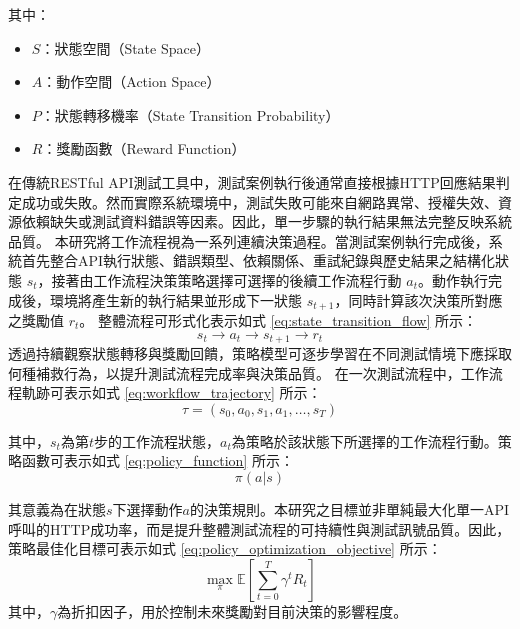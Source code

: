 \begin{ZhChapter}
其中：
\begin{itemize}
\item $S$：狀態空間（State Space）
\item $A$：動作空間（Action Space）
\item $P$：狀態轉移機率（State Transition Probability）
\item $R$：獎勵函數（Reward Function）
\end{itemize}
\text 在傳統RESTful API測試工具中，測試案例執行後通常直接根據HTTP回應結果判定成功或失敗。然而實際系統環境中，測試失敗可能來自網路異常、授權失效、資源依賴缺失或測試資料錯誤等因素。因此，單一步驟的執行結果無法完整反映系統品質。
\text 本研究將工作流程視為一系列連續決策過程。當測試案例執行完成後，系統首先整合API執行狀態、錯誤類型、依賴關係、重試紀錄與歷史結果之結構化狀態 $s_t$，接著由工作流程決策策略選擇可選擇的後續工作流程行動 $a_t$。動作執行完成後，環境將產生新的執行結果並形成下一狀態 $s_{t+1}$，同時計算該次決策所對應之獎勵值 $r_t$。
\text 整體流程可形式化表示如式 \eqref{eq:state_transition_flow} 所示：
\begin{equation}
\label{eq:state_transition_flow}
s_t
\rightarrow
a_t
\rightarrow
s_{t+1}
\rightarrow
r_t
\end{equation}
透過持續觀察狀態轉移與獎勵回饋，策略模型可逐步學習在不同測試情境下應採取何種補救行為，以提升測試流程完成率與決策品質。
\text 在一次測試流程中，工作流程軌跡可表示如式 \eqref{eq:workflow_trajectory} 所示：
\begin{equation}
\label{eq:workflow_trajectory}
\tau=(s_0,a_0,s_1,a_1,\ldots,s_T)
\end{equation}

\text 其中，$s_t$為第$t$步的工作流程狀態，$a_t$為策略於該狀態下所選擇的工作流程行動。策略函數可表示如式 \eqref{eq:policy_function} 所示：
\begin{equation}
\label{eq:policy_function}
\pi(a|s)
\end{equation}

\text 其意義為在狀態$s$下選擇動作$a$的決策規則。本研究之目標並非單純最大化單一API呼叫的HTTP成功率，而是提升整體測試流程的可持續性與測試訊號品質。因此，策略最佳化目標可表示如式 \eqref{eq:policy_optimization_objective} 所示：
\begin{equation}
\label{eq:policy_optimization_objective}
\max_{\pi} \mathbb{E}\left[\sum_{t=0}^{T}\gamma^t R_t\right]
\end{equation}
\text 其中，$\gamma$為折扣因子，用於控制未來獎勵對目前決策的影響程度。


\end{ZhChapter}
